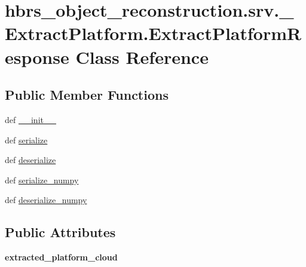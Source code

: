 \hypertarget{classhbrs__object__reconstruction_1_1srv_1_1___extract_platform_1_1_extract_platform_response}{\section{hbrs\-\_\-object\-\_\-reconstruction.\-srv.\-\_\-\-Extract\-Platform.\-Extract\-Platform\-Response \-Class \-Reference}
\label{classhbrs__object__reconstruction_1_1srv_1_1___extract_platform_1_1_extract_platform_response}
}
\subsection*{\-Public \-Member \-Functions}
\begin{DoxyCompactItemize}
\item 
def \hyperlink{classhbrs__object__reconstruction_1_1srv_1_1___extract_platform_1_1_extract_platform_response_aa275a722b5d1c769794ba41cecc688f0}{\-\_\-\-\_\-init\-\_\-\-\_\-}
\item 
def \hyperlink{classhbrs__object__reconstruction_1_1srv_1_1___extract_platform_1_1_extract_platform_response_a36ddea987134992e81493e4b45c19a5a}{serialize}
\item 
def \hyperlink{classhbrs__object__reconstruction_1_1srv_1_1___extract_platform_1_1_extract_platform_response_a52fdcbc557f04573d4d68a7783bb483c}{deserialize}
\item 
def \hyperlink{classhbrs__object__reconstruction_1_1srv_1_1___extract_platform_1_1_extract_platform_response_afa91001bd37192b3c615f892d4ec70f4}{serialize\-\_\-numpy}
\item 
def \hyperlink{classhbrs__object__reconstruction_1_1srv_1_1___extract_platform_1_1_extract_platform_response_acdbbc038b951e4ff5617b11b336838e8}{deserialize\-\_\-numpy}
\end{DoxyCompactItemize}
\subsection*{\-Public \-Attributes}
\begin{DoxyCompactItemize}
\item 
\hypertarget{classhbrs__object__reconstruction_1_1srv_1_1___extract_platform_1_1_extract_platform_response_a541133d8573de59877d757d4412cc1b1}{{\bfseries extracted\-\_\-platform\-\_\-cloud}}\label{classhbrs__object__reconstruction_1_1srv_1_1___extract_platform_1_1_extract_platform_response_a541133d8573de59877d757d4412cc1b1}

\end{DoxyCompactItemize}


